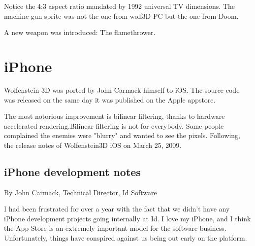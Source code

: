 \documentclass[book.tex]{subfiles}
\begin{document}
\par
\begin{figure}[H]
\centering
\end{figure}
\par
\begin{figure}[H]
\centering
\end{figure}
\par
Notice the 4:3 aspect ratio mandated by 1992 universal TV dimensions. The machine gun sprite was not the one from wolf3D PC but the one from Doom.
\begin{figure}[H]
\centering
\end{figure}
A new weapon was introduced: The flamethrower.



\section{iPhone}
Wolfenstein 3D was ported by John Carmack himself to iOS. The source code was released on the same day it was published on the Apple appstore.
    \par
\begin{figure}[H]
\centering
 \end{figure}
 \par
 The most notorious improvement is bilinear filtering, thanks to hardware accelerated rendering.Bilinear filtering is not for everybody. Some people complained the enemies were "blurry" and wanted to see the pixels. Following, the release notes of Wolfenstein3D iOS on March 25, 2009.

\subsection{iPhone development notes}

By John Carmack, Technical Director, Id Software\\
\par

I had been frustrated for over a year with the fact that we didn't have any iPhone development projects going internally at Id.  I love my iPhone, and I think the App Store is an extremely important model for the software business.  Unfortunately, things have conspired against us being out early on the platform.\\
\par
\end{document}
